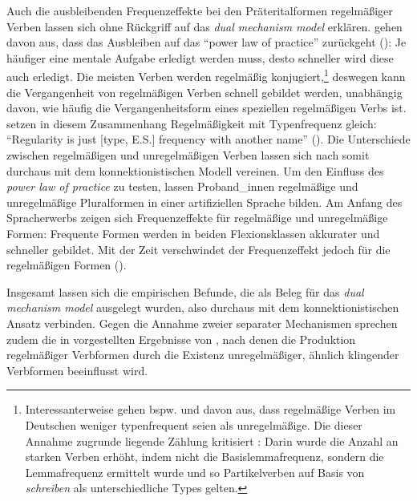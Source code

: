 Auch die ausbleibenden Frequenzeffekte bei den Präteritalformen regelmäßiger Verben lassen sich ohne Rückgriff auf das \textit{dual mechanism model} erklären. \textcite{Ellis.1998} gehen davon aus, dass das Ausbleiben auf das "`power law of practice"' zurückgeht (\cite[307]{Ellis.1998}): Je häufiger eine mentale Aufgabe erledigt werden muss, desto schneller wird diese auch erledigt. Die meisten Verben werden regelmäßig konjugiert,\footnote{Interessanterweise gehen bspw. \textcite[6]{Clahsen.1993} und \textcite[72]{Beretta.2003} davon aus, dass regelmäßige Verben im Deutschen weniger typenfrequent seien als unregelmäßige. Die dieser Annahme zugrunde liegende Zählung kritisiert \textcite[435--438]{Bybee.1995}: Darin wurde die Anzahl an starken Verben erhöht, indem nicht die Basislemmafrequenz, sondern die Lemmafrequenz ermittelt wurde und so Partikelverben auf Basis von \textit{schreiben} als unterschiedliche Types gelten.} deswegen kann die Vergangenheit von regelmäßigen Verben schnell gebildet werden, unabhängig davon, wie häufig die Vergangenheitsform eines speziellen regelmäßigen Verbs ist. \textcite[307]{Ellis.1998} setzen in diesem Zusammenhang Regelmäßigkeit mit Typenfrequenz gleich: "`Regularity is just [type, E.S.] frequency with another name"' (\cite[307]{Ellis.1998}). Die Unterschiede zwischen regelmäßigen und unregelmäßigen Verben lassen sich nach \textcite[309]{Ellis.1998} somit durchaus mit dem konnektionistischen Modell vereinen. Um den Einfluss des \textit{power law of practice} zu testen, lassen \textcite[311--316]{Ellis.1998} Proband\_innen regelmäßige und unregelmäßige Pluralformen in einer artifiziellen Sprache bilden. Am Anfang des Spracherwerbs zeigen sich Frequenzeffekte für regelmäßige und unregelmäßige Formen: Frequente Formen werden in beiden Flexionsklassen akkurater und schneller gebildet. Mit der Zeit verschwindet der Frequenzeffekt jedoch für die regelmäßigen Formen (\cite[313--315]{Ellis.1998}).

Insgesamt lassen sich die empirischen Befunde, die als Beleg für das \textit{dual mechanism model} ausgelegt wurden, also durchaus mit dem konnektionistischen Ansatz verbinden. Gegen die Annahme zweier separater Mechanismen sprechen zudem die in  vorgestellten Ergebnisse von \textcite{Seidenberg.1992}, nach denen die Produktion regelmäßiger Verbformen durch die Existenz unregelmäßiger, ähnlich klingender Verbformen beeinflusst wird. 

